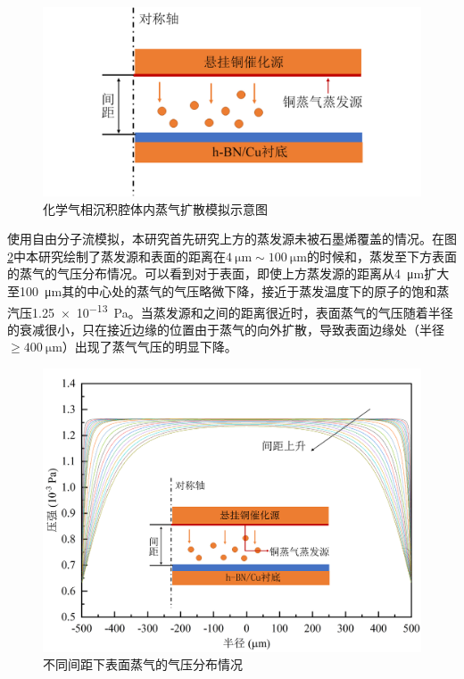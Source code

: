     \begin{figure}[htb]
        \includegraphics{pic/CG_diagram_FEM_structure.png}
        \caption{化学气相沉积腔体内蒸气扩散模拟示意图}
        \label{fig:CG_diagram_FEM_structure}
    \end{figure}

    使用自由分子流模拟，本研究首先研究上方的蒸发源未被石墨烯覆盖的情况。在图\ref{fig:CG_FEM_fullCu}中本研究绘制了蒸发源和表面的距离在$\SI{4}{\micro\meter} \sim \SI{100}{\micro\meter}$的时候和，蒸发至下方表面的蒸气的气压分布情况。可以看到对于表面，即使上方蒸发源的距离从\SI{4}{\micro\meter}扩大至\SI{100}{\micro\meter}其的中心处的蒸气的气压略微下降，接近于蒸发温度下的原子的饱和蒸汽压\SI{1.25e-13}{\pascal}。当蒸发源和之间的距离很近时，表面蒸气的气压随着半径的衰减很小，只在接近边缘的位置由于蒸气的向外扩散，导致表面边缘处（半径$\geqslant \SI{400}{\micro\meter}$）出现了蒸气气压的明显下降。
    
    \begin{figure}[htb]
        \includegraphics{pic/CG_FEM_fullCu.png}
        \caption{不同间距下表面蒸气的气压分布情况}
        \label{fig:CG_FEM_fullCu}
    \end{figure}


